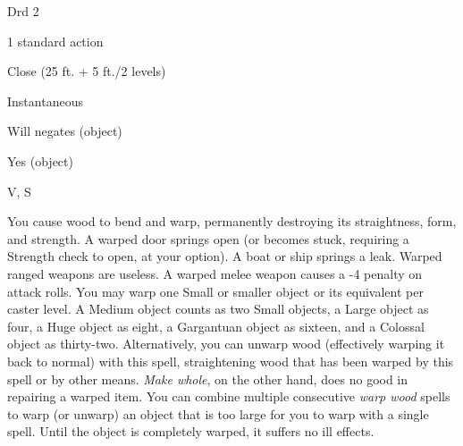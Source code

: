 
\begin{description*}
\item[Level:] Drd 2
\item[Casting Time:] 1 standard action
\item[Range:] Close (25 ft. + 5 ft./2 levels)
\item[Duration:] Instantaneous
\item[Saving Throw:] Will negates (object)
\item[Spell Resistance:] Yes (object)
\item[Components:] V, S
\end{description*}

You cause wood to bend and warp, permanently destroying its straightness, form,
and strength. A warped door springs open (or becomes stuck, requiring a Strength
check to open, at your option). A boat or ship springs a leak. Warped ranged weapons
are useless. A warped melee weapon causes a -4 penalty on attack rolls.
You may warp one Small or smaller object or its equivalent per caster level. A
Medium object counts as two Small objects, a Large object as four, a Huge object
as eight, a Gargantuan object as sixteen, and a Colossal object as thirty-two.
Alternatively, you can unwarp wood (effectively warping it back to normal) with
this spell, straightening wood that has been warped by this spell or by other means.
\textit{Make whole}, on the other hand, does no good in repairing a warped item.
You can combine multiple consecutive \textit{warp wood} spells to warp (or unwarp)
an object that is too large for you to warp with a single spell.
Until the object is completely warped, it suffers no ill effects.